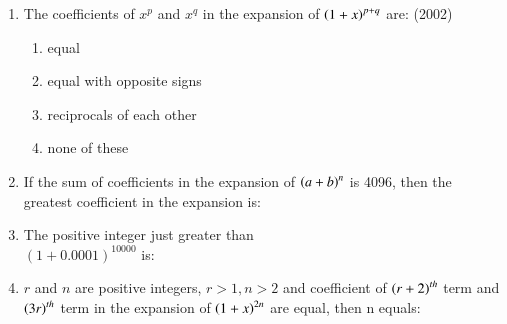 \documentclass[journal]{IEEEtran}
\begin{document}
\begin{enumerate}
	\item The coefficients of $x^p$ and $x^q$ in the expansion of $\left(1+x\right)^{p+q}$ are:
	\hfill{(2002)}
	\begin{enumerate}
		\item equal
		\item equal with opposite signs
		\item reciprocals of each other
		\item none of these
	\end{enumerate}
\item If the sum of coefficients in the expansion of $\left(a+b\right)^n$ is 4096, then the greatest coefficient in the expansion is:  
	\hfill{}
	\begin{enumerate}
	\end{enumerate}
\item The positive integer just greater than \\
$(1+0.0001)^{10000}$ is: 
		\hfill{\brak{2002}}
	\begin{enumerate}
			\begin{multicols}{4}
		\item $4$
		\item $5$
		\item $2$
		\item $3$
			\end{multicols}
	\end{enumerate}
\item $r$ and $n$ are positive integers, $r>1, n>2$ and coefficient of $\left(r+2\right)^{th}$ term and $\left(3r\right)^{th}$ term in the expansion of $\left(1+x\right)^{2n}$ are equal, then n equals:


\end{enumerate}
\end{document}
